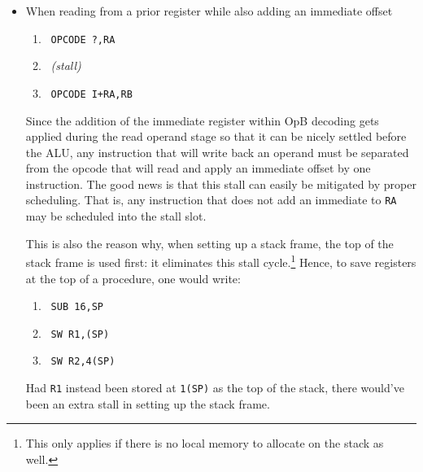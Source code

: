 \documentclass{gqtekspec}
\begin{document}
\begin{itemize}
The decode stage can handle the {\tt ADD \$X,PC}, {\tt LDI \$X,PC}, and
{\tt LW (PC),PC} instructions specially, however, when {\tt EARLY\_BRANCHING}
is enabled.  These instructions, when
not conditioned on the flags, can execute with only a single stall cycle (two
for the {\tt LW(PC),PC} instruction),
such as is shown in Fig.~\ref{fig:branch}.
\begin{figure}\begin{center}
\texttt{[image: ../gfx/bra.eps]} %
\caption{An expedited branch costs a single stall cycle}\label{fig:branch}
\end{center}\end{figure}
In this example, {\tt BR} is a branch always taken, {\tt I1} is the instruction
following the branch in memory, while {\tt IA} is the first instruction at the
branch address.  ({\tt CLR} denotes a clear--pipeline operation, and does
not represent any instruction.)

\item When reading from a prior register while also adding an immediate offset
\begin{enumerate}
\item\ {\tt OPCODE ?,RA}
\item\ {\em (stall)}
\item\ {\tt OPCODE I+RA,RB}
\end{enumerate}

Since the addition of the immediate register within OpB decoding gets applied
during the read operand stage so that it can be nicely settled before the ALU,
any instruction that will write back an operand must be separated from the
opcode that will read and apply an immediate offset by one instruction.  The
good news is that this stall can easily be mitigated by proper scheduling.
That is, any instruction that does not add an immediate to {\tt RA} may be
scheduled into the stall slot.

This is also the reason why, when setting up a stack frame, the top of the
stack frame is used first: it eliminates this stall cycle.\footnote{This only
applies if there is no local memory to allocate on the stack as well.}  Hence,
to save registers at the top of a procedure, one would write:
\begin{enumerate}
\item\ {\tt SUB 16,SP}
\item\ {\tt SW R1,(SP)}
\item\ {\tt SW R2,4(SP)}
\end{enumerate}
Had {\tt R1} instead been stored at {\tt 1(SP)} as the top of the stack,
there would've been an extra stall in setting up the stack frame.


\end{itemize}
\end{document}
